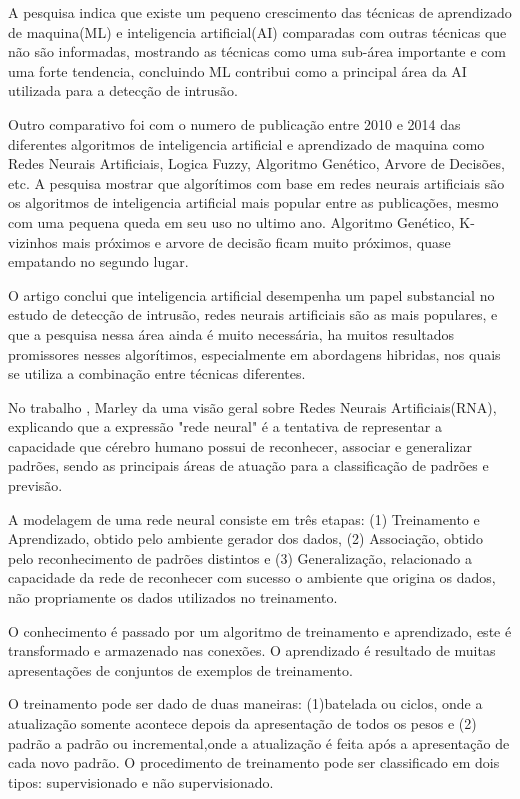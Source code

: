 \documentclass[
	12pt,				%
	openright,			%
	oneside,
	a4paper,			%
	english,			%
	french,				%
	spanish,			%
	brazil				%
	]{abntex2}
\begin{document}
A pesquisa indica que existe um pequeno crescimento das técnicas de aprendizado de maquina(ML) e inteligencia artificial(AI) comparadas com outras técnicas que não são informadas, mostrando as técnicas como uma sub-área importante e com uma forte tendencia, concluindo ML contribui como a principal área da AI utilizada para a detecção de intrusão.

Outro comparativo foi com o numero de publicação entre 2010 e 2014 das diferentes algoritmos de inteligencia artificial e aprendizado de maquina como Redes Neurais Artificiais, Logica Fuzzy, Algoritmo Genético, Arvore de Decisões, etc. A pesquisa mostrar que algorítimos com base em redes neurais artificiais são os algoritmos de inteligencia artificial mais popular entre as publicações, mesmo com uma pequena queda em seu uso no ultimo ano. Algoritmo Genético, K-vizinhos mais próximos e arvore de decisão ficam muito próximos, quase empatando no segundo lugar.

O artigo conclui que inteligencia artificial desempenha um papel substancial no estudo de detecção de intrusão, redes neurais artificiais  são as mais populares, e que a pesquisa nessa área ainda é muito necessária, ha muitos resultados promissores nesses algorítimos,  especialmente em abordagens hibridas, nos quais se utiliza a combinação entre técnicas diferentes.


No trabalho \cite{Marley}, Marley da uma visão geral sobre Redes Neurais Artificiais(RNA), explicando que a expressão "rede neural" é a tentativa de representar a capacidade que cérebro humano possui de reconhecer, associar e generalizar padrões, sendo as principais áreas de atuação para a classificação de padrões e previsão.

A modelagem de uma rede neural consiste em três etapas: (1) Treinamento e Aprendizado, obtido pelo ambiente gerador dos dados, (2) Associação, obtido pelo reconhecimento de padrões distintos e (3) Generalização, relacionado a capacidade da rede de reconhecer com sucesso o ambiente que origina os dados, não propriamente os dados utilizados no treinamento.

O conhecimento é passado por um algoritmo de treinamento e aprendizado, este é transformado e armazenado nas conexões. 
O aprendizado é resultado de muitas apresentações de conjuntos de exemplos de treinamento.

O treinamento pode ser dado de duas maneiras: (1)batelada ou ciclos, onde a atualização somente acontece depois da apresentação de todos os pesos e (2) padrão a padrão ou incremental,onde a atualização é feita após a apresentação de cada novo padrão. O procedimento de treinamento pode ser classificado em dois tipos: supervisionado e não supervisionado.
\end{document}
